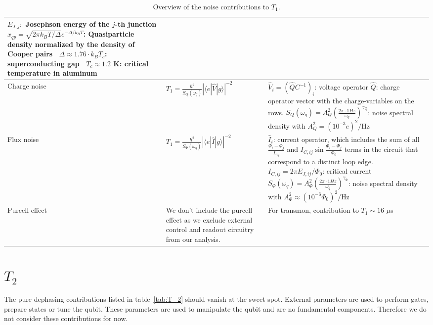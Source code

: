 \documentclass[]{article}
\newcommand{\ket}[1]{| #1 \rangle}
\newcommand{\bra}[1]{\langle #1 |}
\begin{document}
\begin{table}[h]
\begin{tabular}{|p{2cm}|p{5.7cm}|p{7.5cm}|}
$E_{J,j}:$ Josephson energy of the $j$-th junction \newline
$x_{qp}=\sqrt{2\pi k_B T/ \Delta}e^{-\Delta / k_B T}$: Quasiparticle density normalized by the density of Cooper pairs~\cite{catelani2011PRL} \newline
$\Delta\approx 1.76 \cdot k_B T_c$: superconducting gap~\cite{gap} \newline
$T_c \approx 1.2$ K: critical temperature in aluminum~\cite{T_c} \\
\hline 
Charge noise & $T_1 = \frac{\hbar^2}{S_{Q}(\omega_q)} \left| \bra{e} \hat{V} \ket{g} \right|^{-2}$~\cite{yan2016}
& $\hat{V}_i=\left(\hat{Q}C^{-1} \right)_i$: voltage operator \newline 
$\hat{Q}$: charge operator vector with the charge-variables on the rows.\newline
$S_{Q}(\omega_q)=A_Q^2\left( \frac{2\pi \cdot 1 Hz}{\omega_q} \right)^{\gamma_Q}$: noise spectral density with $A_Q^2=(10^{-3}e)^2/$Hz~\cite{krantz2019} \\
\hline
Flux noise & $T_1 = \frac{\hbar^2}{S_{\Phi}(\omega_q)} \left| \bra{e} \hat{I} \ket{g} \right|^{-2}$~\cite{yan2016}
& $\hat{I}_i$: current operator, which includes the sum of all $\frac{\Phi_i-\Phi_j}{L_{ij}}$ and $I_{C, ij}  \sin \frac{\Phi_i-\Phi_j}{\Phi_0}$ terms in the circuit that correspond to a distinct loop edge. \newline 
$I_{C, ij} = 2 \pi E_{J, ij} / \Phi_0$: critical current \newline
$S_{\Phi}(\omega_q)=A_{\Phi}^2\left( \frac{2\pi \cdot 1 Hz}{\omega_q} \right)^{\gamma_{\Phi}}$: noise spectral density with $A_{\Phi}^2\approx(10^{-6} \Phi_0)^2/$Hz~\cite{krantz2019} \\
\hline
Purcell effect & We don't include the purcell effect as we exclude external control and readout circuitry from our analysis. 
& For transmon, contribution to  $T_1 \sim 16$ $\mu$s~\cite{koch2007}  \\
\hline

\end{tabular} 
\caption{Overview of the noise contributions to $T_1$.}
\label{tab:T_1}
\end{table}


\section{$T_2$}
The pure dephasing contributions listed in table~\ref{tab:T_2} should vanish at the sweet spot. External parameters are used to perform gates, prepare states or tune the qubit. These parameters are used to manipulate the qubit and are no fundamental components. Therefore we do not consider these contributions for now.
\end{document}
